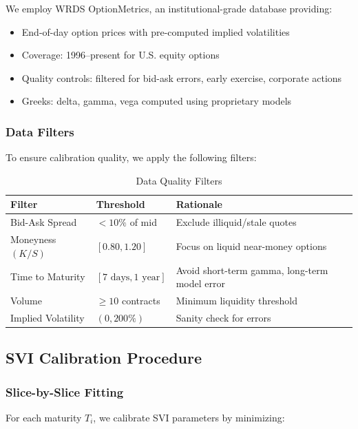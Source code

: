 \documentclass[12pt,a4paper]{article}
\begin{document}
We employ WRDS OptionMetrics, an institutional-grade database providing:
\begin{itemize}
    \item End-of-day option prices with pre-computed implied volatilities
    \item Coverage: 1996--present for U.S. equity options
    \item Quality controls: filtered for bid-ask errors, early exercise, corporate actions
    \item Greeks: delta, gamma, vega computed using proprietary models
\end{itemize}

\subsubsection{Data Filters}

To ensure calibration quality, we apply the following filters:

\begin{table}[h]
\centering
\caption{Data Quality Filters}
\begin{tabular}{lll}
\toprule
\textbf{Filter} & \textbf{Threshold} & \textbf{Rationale} \\
\midrule
Bid-Ask Spread & $< 10\%$ of mid & Exclude illiquid/stale quotes \\
Moneyness $(K/S)$ & $[0.80, 1.20]$ & Focus on liquid near-money options \\
Time to Maturity & $[7\text{ days}, 1\text{ year}]$ & Avoid short-term gamma, long-term model error \\
Volume & $\geq 10$ contracts & Minimum liquidity threshold \\
Implied Volatility & $(0, 200\%)$ & Sanity check for errors \\
\bottomrule
\end{tabular}
\end{table}

\subsection{SVI Calibration Procedure}

\subsubsection{Slice-by-Slice Fitting}

For each maturity $T_i$, we calibrate SVI parameters by minimizing:
\end{document}
